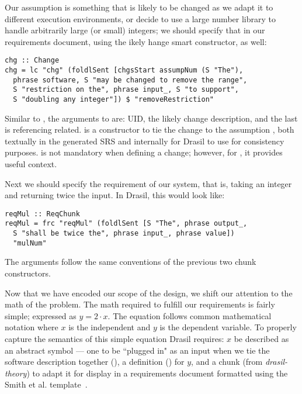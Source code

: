 Our assumption is something that is likely to be changed as we adapt it to different execution environments, or decide to use a large number library to handle arbitrarily large (or small) integers; we should specify that in our requirements document, using the ikely hange smart constructor, as well:
\begin{tcolorbox}[breakable, toprule at break=0pt, bottomrule at break=0pt]
\begin{verbatim}
chg :: Change
chg = lc "chg" (foldlSent [chgsStart assumpNum (S "The"),
  phrase software, S "may be changed to remove the range",
  S "restriction on the", phrase input_, S "to support",
  S "doubling any integer"]) $ "removeRestriction"
\end{verbatim}
\end{tcolorbox}
Similar to , the arguments to  are: UID, the likely change description, and the last is referencing related.  is a constructor to tie the change to the assumption , both textually in the generated SRS and internally for Drasil to use for consistency purposes.  is not mandatory when defining a change; however, for , it provides useful context.

Next we should specify the requirement of our system, that is, taking an integer and returning twice the input. In Drasil, this would look like:
\begin{tcolorbox}
\begin{verbatim}
reqMul :: ReqChunk
reqMul = frc "reqMul" (foldlSent [S "The", phrase output_,
  S "shall be twice the", phrase input_, phrase value])
  "mulNum"
\end{verbatim}
\end{tcolorbox}
The arguments follow the same conventions of the previous two chunk constructors.

Now that we have encoded our scope of the design, we shift our attention to the math of the problem. The math required to fulfill our requirements is fairly simple; expressed as $y = 2\cdot x$. The equation follows common mathematical notation where $x$ is the independent and $y$ is the dependent variable. To properly capture the semantics of this simple equation Drasil requires: $x$ be described as an abstract symbol --- one to be ``plugged in" as an input when we tie the software description together (), a definition () for $y$, and a  chunk (from \textit{drasil-theory}) to adapt it for display in a requirements document formatted using the Smith et al. template~\cite{smith2005new}.

